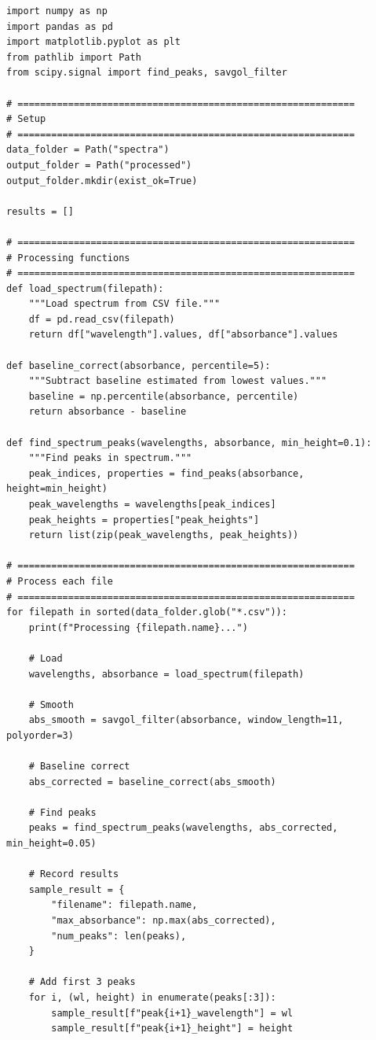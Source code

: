 \begin{lstlisting}
import numpy as np
import pandas as pd
import matplotlib.pyplot as plt
from pathlib import Path
from scipy.signal import find_peaks, savgol_filter

# ============================================================
# Setup
# ============================================================
data_folder = Path("spectra")
output_folder = Path("processed")
output_folder.mkdir(exist_ok=True)

results = []

# ============================================================
# Processing functions
# ============================================================
def load_spectrum(filepath):
    """Load spectrum from CSV file."""
    df = pd.read_csv(filepath)
    return df["wavelength"].values, df["absorbance"].values

def baseline_correct(absorbance, percentile=5):
    """Subtract baseline estimated from lowest values."""
    baseline = np.percentile(absorbance, percentile)
    return absorbance - baseline

def find_spectrum_peaks(wavelengths, absorbance, min_height=0.1):
    """Find peaks in spectrum."""
    peak_indices, properties = find_peaks(absorbance, height=min_height)
    peak_wavelengths = wavelengths[peak_indices]
    peak_heights = properties["peak_heights"]
    return list(zip(peak_wavelengths, peak_heights))

# ============================================================
# Process each file
# ============================================================
for filepath in sorted(data_folder.glob("*.csv")):
    print(f"Processing {filepath.name}...")

    # Load
    wavelengths, absorbance = load_spectrum(filepath)

    # Smooth
    abs_smooth = savgol_filter(absorbance, window_length=11, polyorder=3)

    # Baseline correct
    abs_corrected = baseline_correct(abs_smooth)

    # Find peaks
    peaks = find_spectrum_peaks(wavelengths, abs_corrected, min_height=0.05)

    # Record results
    sample_result = {
        "filename": filepath.name,
        "max_absorbance": np.max(abs_corrected),
        "num_peaks": len(peaks),
    }

    # Add first 3 peaks
    for i, (wl, height) in enumerate(peaks[:3]):
        sample_result[f"peak{i+1}_wavelength"] = wl
        sample_result[f"peak{i+1}_height"] = height


\end{lstlisting}
